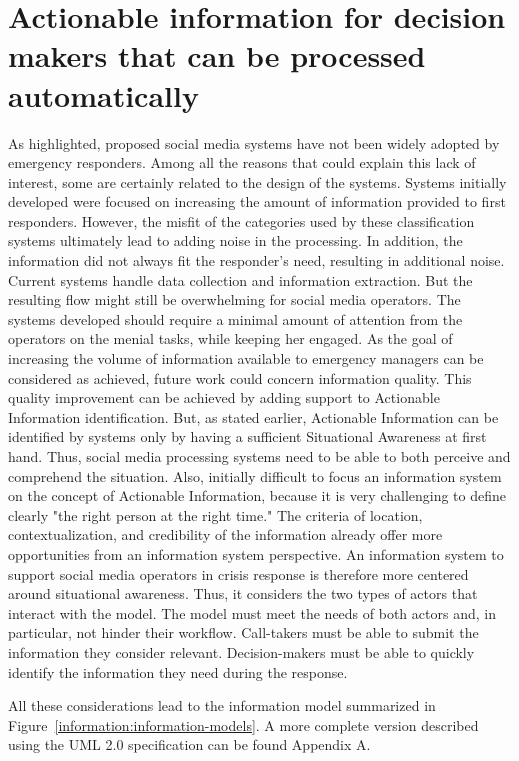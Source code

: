\section{Actionable information for decision makers that can be processed automatically}
As \textcite{zadeSituationalAwarenessActionability2018} highlighted, proposed social media systems have not been widely adopted by emergency responders.
Among all the reasons that could explain this lack of interest, some are certainly related to the design of the systems.
Systems initially developed were focused on increasing the amount of information provided to first responders.
However, the misfit of the categories used by these classification systems ultimately lead to adding noise in the processing.
In addition, the information did not always fit the responder's need, resulting in additional noise.
Current systems handle data collection and information extraction.
But the resulting flow might still be overwhelming for social media operators.
The systems developed should require a minimal amount of attention from the operators on the menial tasks, while keeping her engaged.
As the goal of increasing the volume of information available to emergency managers can be considered as achieved, future work could concern information quality.
This quality improvement can be achieved by adding support to Actionable Information identification.
But, as stated earlier, Actionable Information can be identified by systems only by having a sufficient Situational Awareness at first hand.
Thus, social media processing systems need to be able to both perceive and comprehend the situation.
Also, initially difficult to focus an information system on the concept of Actionable Information,
because it is very challenging to define clearly "the right person at the right time."
The criteria of location, contextualization, and credibility of the information already offer more opportunities from an information system perspective.
An information system to support social media operators in crisis response is therefore more centered around situational awareness.
Thus, it considers the two types of actors that interact with the model.
The model must meet the needs of both actors and, in particular, not hinder their workflow.
Call-takers must be able to submit the information they consider relevant.
Decision-makers must be able to quickly identify the information they need during the response.

All these considerations lead to the information model summarized in Figure~\ref{information:information-models}.
A more complete version described using the UML 2.0 specification can be found Appendix A.

